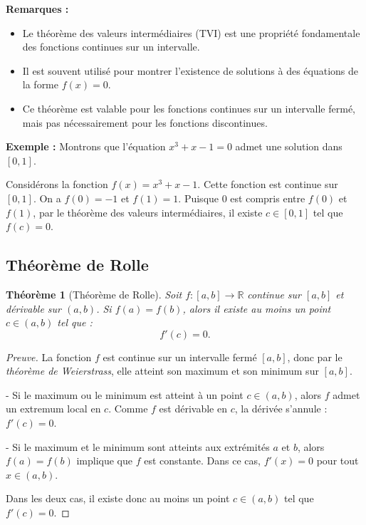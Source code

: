 \documentclass{report} %
\theoremstyle{definition}  %
\theoremstyle{plain} %
\newtheorem{theorem}{Théorème}[chapter]
\theoremstyle{remark} %
\begin{document}
\medskip

\textbf{Remarques :}
\begin{itemize}
    \item Le théorème des valeurs intermédiaires (TVI) est une propriété fondamentale des fonctions continues sur un intervalle.
    \item Il est souvent utilisé pour montrer l'existence de solutions à des équations de la forme \( f(x) = 0 \).
    \item Ce théorème est valable pour les fonctions continues sur un intervalle fermé, mais pas nécessairement pour les fonctions discontinues.
\end{itemize}


\medskip

\medskip
\noindent
\textbf{Exemple :} Montrons que l'équation \( x^3 + x - 1 = 0 \) admet une solution dans \([0, 1]\).

\medskip
\noindent
Considérons la fonction \( f(x) = x^3 + x - 1 \). Cette fonction est continue sur \([0, 1]\). On a \( f(0) = -1 \) et \( f(1) = 1 \). Puisque \( 0 \) est compris entre \( f(0) \) et \( f(1) \), 
par le théorème des valeurs intermédiaires, il existe \( c \in [0, 1] \) tel que \( f(c) = 0 \).

\medskip

\subsection{Théorème de Rolle}

\begin{theorem}[Théorème de Rolle]
Soit \(f : [a,b] \to \mathbb{R}\) continue sur \([a,b]\) et dérivable sur \((a,b)\).  
Si \(f(a) = f(b)\), alors il existe au moins un point \(c \in (a,b)\) tel que :
\[
f'(c) = 0.
\]
\end{theorem}

\medskip

\begin{proof}[Preuve]
La fonction \(f\) est continue sur un intervalle fermé \([a,b]\), donc par le \emph{théorème de Weierstrass}, elle atteint son maximum et son minimum sur \([a,b]\).

- Si le maximum ou le minimum est atteint à un point \(c \in (a,b)\), alors \(f\) admet un extremum local en \(c\).  
  Comme \(f\) est dérivable en \(c\), la dérivée s'annule : \(f'(c) = 0\).

- Si le maximum et le minimum sont atteints aux extrémités \(a\) et \(b\), alors \(f(a) = f(b)\) implique que \(f\) est constante.  
  Dans ce cas, \(f'(x) = 0\) pour tout \(x \in (a,b)\).

Dans les deux cas, il existe donc au moins un point \(c \in (a,b)\) tel que \(f'(c) = 0\).
\end{proof}
\end{document}

